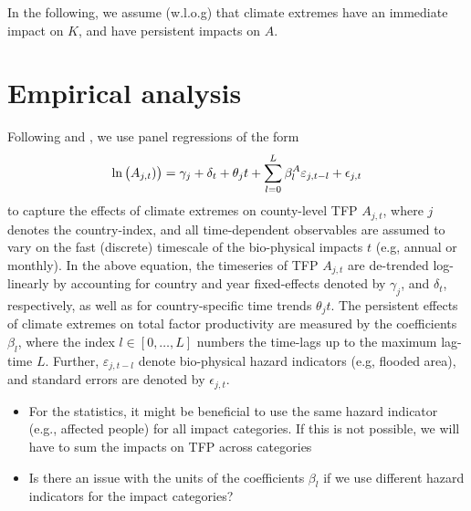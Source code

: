 \documentclass[preprint,3p,authoryear]{elsarticle}
\begin{document}
In the following, we assume (w.l.o.g) that climate extremes have an immediate impact on $K$, and have persistent impacts on $A$.

\section{Empirical analysis}
\label{sec:empAna}
Following \citet{BAK19} and \citet{HSI14}, we use panel regressions of the form
\begin{equation}
  \label{eq:PRA}
  \ln\big(A_{j,t})\big) = \gamma_j + \delta_{t} + \theta_j t + \sum_{l=0}^{L}\beta^A_{l}\varepsilon_{j,t-l}+\epsilon_{j,t}
\end{equation}
to capture the effects of climate extremes on county-level TFP $A_{j,t}$, where $j$ denotes the country-index, and all time-dependent observables are assumed to vary on the fast (discrete) timescale of the bio-physical impacts $t$ (e.g, annual or monthly).
In the above equation, the timeseries of TFP $A_{j,t}$ are de-trended log-linearly by accounting for country and year fixed-effects denoted by $\gamma_j$, and $\delta_t$, respectively, as well as for country-specific time trends $\theta_j t$. The persistent effects of climate extremes on total factor productivity are measured by the coefficients $\beta_l$, where the index $l\in[0,\ldots,L]$ numbers the time-lags up to the maximum lag-time $L$. Further, $\varepsilon_{j,t-l}$ denote bio-physical hazard indicators (e.g, flooded area), and standard errors are denoted by $\epsilon_{j,t}$.
\begin{itemize}
\item For the statistics, it might be beneficial to use the same hazard indicator (e.g., affected people) for all impact categories. If this is not possible, we will have to sum the impacts on TFP across categories
  \item Is there an issue with the units of the coefficients $\beta_l$ if we use different hazard indicators for the impact categories?
\end{itemize}
\end{document}
